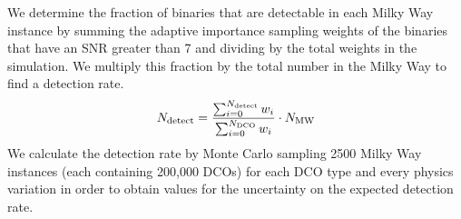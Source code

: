 We determine the fraction of binaries that are detectable in each Milky Way instance by summing the adaptive importance sampling weights of the binaries that have an SNR greater than 7 and dividing by the total weights in the simulation. We multiply this fraction by the total number in the Milky Way to find a detection rate.
\begin{equation}
    N_{\rm detect} = \frac{\sum_{i = 0}^{N_{\rm detect}} w_i}{\sum_{i = 0}^{N_{\rm DCO}} w_i} \cdot N_{\rm MW}
\end{equation}
We calculate the detection rate by Monte Carlo sampling 2500 Milky Way instances (each containing 200,000 DCOs) for each DCO type and every physics variation in order to obtain values for the uncertainty on the expected detection rate.